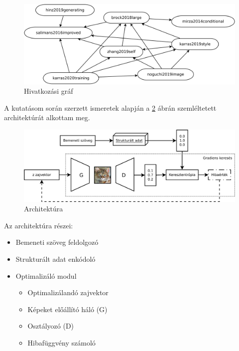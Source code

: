 \begin{figure}[h]
	\centering
	\includegraphics[width=15cm]{images/gancite.png}
	\caption{Hivatkozási gráf}
	\label{fig:gancite}
\end{figure}



A kutatásom során szerzett ismeretek alapján a \ref{fig:architecture} ábrán szemléltetett architektúrát alkottam meg.

\begin{figure}[h]
\centering
\includegraphics[width=15cm]{images/architecture.png}
\caption{Architektúra}
\label{fig:architecture}
\end{figure}

Az architektúra részei:

\begin{itemize}
	\item Bemeneti szöveg feldolgozó
	\item Strukturált adat enkódoló
	\item Optimalizáló modul
		\begin{itemize}
			\item Optimalizálandó zajvektor
			\item Képeket előállító háló (G)
			\item Osztályozó (D)
			\item Hibafüggvény számoló
		\end{itemize}
\end{itemize}

